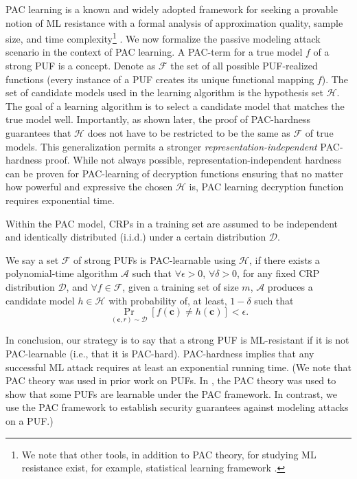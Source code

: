  PAC learning is a known and widely adopted framework for seeking a provable notion of ML resistance with a formal analysis of approximation quality, sample size, and time complexity\footnote{We note that other tools, in addition to PAC theory, for studying ML resistance exist, for example, statistical learning framework \cite{mohri2012foundations}.} \cite{mohri2012foundations}.
We now formalize the passive modeling attack scenario in the context of PAC learning.
A PAC-term for a true model $f$ of a strong PUF is a concept.
Denote as $\mathcal{F}$ the set of all possible PUF-realized functions (every instance of a PUF creates its unique functional mapping $f$).
The set of candidate models used in the learning algorithm is the hypothesis set $\mathcal{H}$. The goal of a learning algorithm is to select a candidate model that matches the true model well. 
Importantly, as shown later, the proof of PAC-hardness guarantees that $\mathcal{H}$ does not have to be restricted to be the same as $\mathcal{F}$ of true models.
This generalization permits a stronger \emph{representation-independent} PAC-hardness proof. While not always possible, representation-independent hardness can be proven for PAC-learning of decryption functions ensuring that no matter how powerful and expressive the chosen $\mathcal{H}$ is, PAC learning decryption function requires exponential time. 

Within the PAC model, CRPs in a training set are assumed to be independent and identically distributed (i.i.d.) under a certain distribution $\mathcal{D}$.

We say a set $\mathcal{F}$ of strong PUFs is PAC-learnable using $\mathcal{H}$, if there exists a polynomial-time algorithm $\mathcal{A}$ such that $\forall \epsilon > 0$, $\forall \delta >0$, for any fixed CRP distribution $\mathcal{D}$, and $\forall f\in\mathcal{F}$, given a training set of size $m$, $\mathcal{A}$ produces a candidate model $h\in\mathcal{H}$ with probability of, at least, $1-\delta$ such that
\begin{equation*}
\Pr_{(\mathbf{c},r)\sim\mathcal{D}}[f(\mathbf{c})\neq h(\mathbf{c})] < \epsilon.
\end{equation*}

In conclusion, our strategy is to say that a strong PUF is ML-resistant if it is not PAC-learnable (i.e., that it is PAC-hard). 
PAC-hardness implies that any successful ML attack requires at least an exponential running time. (We note that PAC theory was used in prior work on PUFs. In \cite{pac_learn_interpose_puf, tamper_proof_sunar, strong_ml_attack_ganji}, the PAC theory was used to show that some PUFs are learnable under the PAC framework. In contrast, we use the PAC framework to establish security guarantees against modeling attacks on a PUF.)

